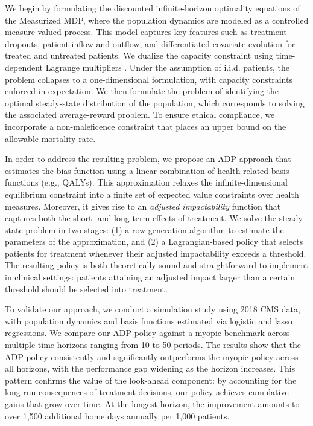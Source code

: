 \documentclass[12pt,a4paper]{article}
\begin{document}
We begin by formulating the discounted infinite-horizon optimality equations of the Measurized MDP, where the population dynamics are modeled as a controlled measure-valued process. This model captures key features such as treatment dropouts, patient inflow and outflow, and differentiated covariate evolution for treated and untreated patients. We dualize the capacity constraint using time-dependent Lagrange multipliers \citep{measurizedWMDP}. Under the assumption of i.i.d. patients, the problem collapses to a one-dimensional formulation, with capacity constraints enforced in expectation. We then formulate the problem of identifying the optimal steady-state distribution of the population, which corresponds to solving the associated average-reward problem. To ensure ethical compliance, we incorporate a non-maleficence constraint that places an upper bound on the allowable mortality rate.

In order to address the resulting problem, we propose an ADP approach that estimates the bias function using a linear combination of health-related basis functions (e.g., QALYs). This approximation relaxes the infinite-dimensional equilibrium constraint into a finite set of expected value constraints over health measures. Moreover, it gives rise to an {\it adjusted impactability} function that captures both the short- and long-term effects of treatment. We solve the steady-state problem in two stages: (1) a row generation algorithm to estimate the parameters of the approximation, and (2) a Lagrangian-based policy that selects patients for treatment whenever their adjusted impactability exceeds a threshold. The resulting policy is both theoretically sound and straightforward to implement in clinical settings: patients attaining an adjusted impact larger than a certain threshold should be selected into treatment. 

To validate our approach, we conduct a simulation study using 2018 CMS data, with population dynamics and basis functions estimated via logistic and lasso regressions. We compare our ADP policy against a myopic benchmark across multiple time horizons ranging from 10 to 50 periods. The results show that the ADP policy consistently and significantly outperforms the myopic policy across all horizons, with the performance gap widening as the horizon increases. This pattern confirms the value of the look-ahead component: by accounting for the long-run consequences of treatment decisions, our policy achieves cumulative gains that grow over time. At the longest horizon, the improvement amounts to over 1,500 additional home days annually per 1,000 patients.
\end{document}
